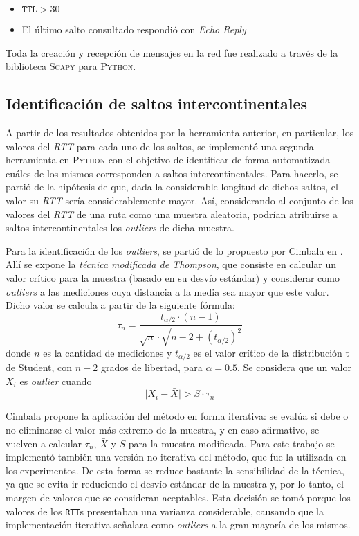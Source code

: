 \begin{itemize}
    \item $\texttt{TTL} > 30$
    \item El último salto consultado respondió con \emph{Echo Reply}
\end{itemize}

Toda la creación y recepción de mensajes en la red fue realizado a través de la
biblioteca \textsc{Scapy} para \textsc{Python}.

\subsection{Identificación de saltos intercontinentales}

A partir de los resultados obtenidos por la herramienta anterior, en
particular, los valores del \emph{RTT} para cada uno de los saltos, se
implementó una segunda herramienta en \textsc{Python} con el objetivo de
identificar de forma automatizada cuáles de los mismos corresponden a saltos
intercontinentales. Para hacerlo, se partió de la hipótesis de que, dada la
considerable longitud de dichos saltos, el valor su \emph{RTT} sería
considerablemente mayor. Así, considerando al conjunto de los valores del
\emph{RTT} de una ruta como una muestra aleatoria, podrían atribuirse a saltos
intercontinentales los \emph{outliers} de dicha muestra.

Para la identificación de los \emph{outliers}, se partió de lo propuesto por
Cimbala en \cite{Cimbala}. Allí se expone la \emph{técnica modificada de
Thompson}, que consiste en calcular un valor crítico para la muestra
(basado en su desvío estándar) y considerar como \emph{outliers} a
las mediciones cuya distancia a la media sea mayor que este valor. Dicho
valor se calcula a partir de la siguiente fórmula:
\[ \tau_n = \frac{t_{\alpha / 2} \cdot (n - 1)}
    {\sqrt{n} \cdot \sqrt{n - 2 + \left(t_{\alpha / 2}\right)^2}} \]
donde $n$ es la cantidad de mediciones y $t_{\alpha / 2}$ es el valor crítico de
la distribución t de Student, con $n - 2$ grados de libertad, para $\alpha =
0.5$. Se considera que un valor $X_i$ es \emph{outlier} cuando
\[ \vert X_i - \bar{X} \vert > S \cdot \tau_n \]

Cimbala propone la aplicación del método en forma iterativa: se evalúa si debe
o no eliminarse el valor más extremo de la muestra, y en caso afirmativo, se
vuelven a calcular $\tau_n$, $\bar{X}$ y $S$ para la muestra modificada. Para
este trabajo se implementó también una versión no iterativa del método, que
fue la utilizada en los experimentos. De esta forma se reduce bastante la
sensibilidad de la técnica, ya que se evita ir reduciendo el desvío estándar
de la muestra y, por lo tanto, el margen de valores que se consideran
aceptables. Esta decisión se tomó porque los valores de los \texttt{RTT}s
presentaban una varianza considerable, causando que la implementación
iterativa señalara como \emph{outliers} a la gran mayoría de los mismos.


